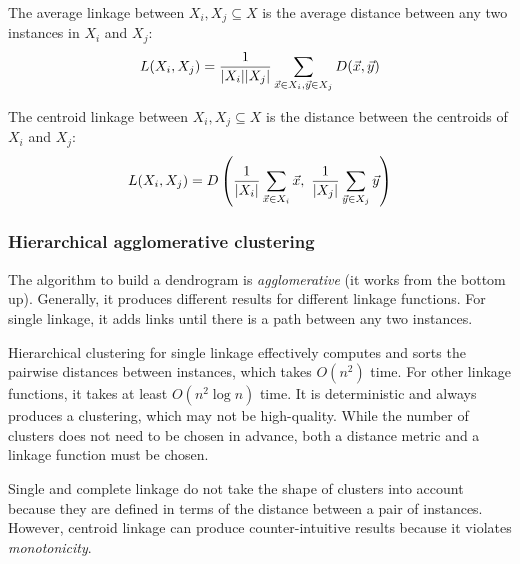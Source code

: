 \begin{dfn}
  The average linkage between $X_i, X_j \subseteq X$ is the average distance
  between any two instances in $X_i$ and $X_j$:
  \begin{equation}
    L(X_i, X_j) =
    \frac{1}{|X_i| |X_j|}
    \sum_{\vec{x} \in X_i, \vec{y} \in X_j} D(\vec{x}, \vec{y})
  \end{equation}
\end{dfn}

\begin{dfn}
  The centroid linkage between $X_i, X_j \subseteq X$ is the distance between
  the centroids of $X_i$ and $X_j$:
  \begin{equation}
    L(X_i, X_j) = D\left( \frac{1}{|X_i|} \sum_{\vec{x} \in X_i} \vec{x},\
    \frac{1}{|X_j|} \sum_{\vec{y} \in X_j} \vec{y} \right)
  \end{equation}
\end{dfn}

\subsubsection{Hierarchical agglomerative
  clustering}

The algorithm to build a dendrogram is
\textit{agglomerative} (it works from the bottom up).
Generally, it produces different results for different linkage functions.
For single linkage, it adds links until there is a path between any two
instances.

Hierarchical clustering for single linkage effectively computes and sorts the
pairwise distances between instances, which takes $O(n^2)$ time.
For other linkage functions, it takes at least $O(n^2 \log n)$ time.
It is deterministic and always produces a clustering, which may not be
high-quality.
While the number of clusters does not need to be chosen in advance, both a
distance metric and a linkage function must be chosen.

Single and complete linkage do not take the shape of clusters into account
because they are defined in terms of the distance between a pair of instances.
However, centroid linkage can produce counter-intuitive results because it
violates \textit{monotonicity}.
